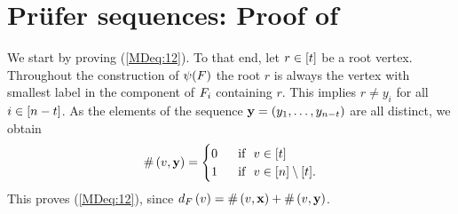 \section[Prüfer sequences]{Prüfer sequences: Proof of }\label{MDsec:proof_pruefer}
We start by proving (\ref{MDeq:12}). To that end, let $r\in[t]$ be a root vertex. Throughout the construction of $\psi(F)$ the root $r$ is always the vertex with smallest label in the component of $F_{i}$ containing $r$. This implies $r\neq y_i$ for all $i\in[n-t]$. As the elements of the sequence $\mathbf{y}=\left(y_1, \ldots, y_{n-t}\right)$ are all distinct, we obtain 
\begin{align}\label{MDeq:21}
	\#\left(v, \mathbf{y}\right)=
	\begin{cases}
		0 & \text{~~if~~} v\in [t]
		\\
		1 & \text{~~if~~} v\in[n]\setminus [t].
	\end{cases}
\end{align}
This proves (\ref{MDeq:12}), since $d_{F}\left(v\right)=\#\left(v, \mathbf{x}\right)+\#\left(v, \mathbf{y}\right)$.

